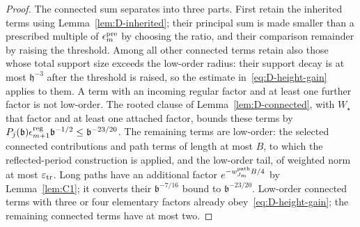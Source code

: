 \begin{proof}
The connected sum separates into three parts. First retain the inherited terms using Lemma~\ref{lem:D-inherited}; their principal sum is made smaller than a prescribed multiple of $\epsilon^{\rm pre}_m$ by choosing the ratio, and their comparison remainder by raising the threshold. Among all other connected terms retain also those whose total support size exceeds the low-order radius: their support decay is at most $\mathfrak h^{-3}$ after the threshold is raised, so the estimate in~\eqref{eq:D-height-gain} applies to them. A term with an incoming regular factor and at least one further factor is not low-order. The rooted clause of Lemma~\ref{lem:D-connected}, with $W_\star$ that factor and at least one attached factor, bounds these terms by $P_j(\mathfrak b)\epsilon_{m+1}^{\rm reg}\mathfrak b^{-1/2}\le\mathfrak b^{-23/20}$. The remaining terms are low-order: the selected connected contributions and path terms of length at most $B$, to which the reflected-period construction is applied, and the low-order tail, of weighted norm at most $\varepsilon_{\rm tr}$. Long paths have an additional factor $e^{-w^{\rm path}_{J_m}B/4}$ by Lemma~\ref{lem:C1}; it converts their $\mathfrak b^{-7/16}$ bound to $\mathfrak b^{-23/20}$. Low-order connected terms with three or four elementary factors already obey~\eqref{eq:D-height-gain}; the remaining connected terms have at most two.


\end{proof}
